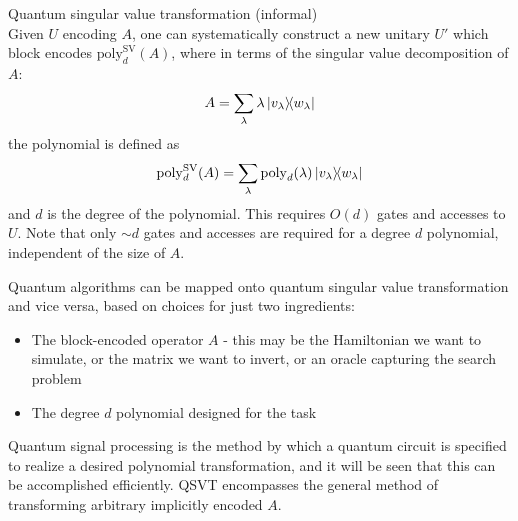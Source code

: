 \begin{claim}
    Quantum singular value transformation (informal) \\
    Given $U$ encoding $A$, one can systematically construct a new unitary $U'$ which block encodes $\text{poly}_d^{\text{SV}}(A)$, where in terms of the singular value decomposition of $A$:
    \begin{equation}
        A = \sum_\lambda \lambda \ketbra{v_\lambda}{w_\lambda}
    \end{equation}
    the polynomial is defined as 
    \begin{equation}\mathrm{poly}_d^{\text{SV}}(A) = \sum_\lambda \mathrm{poly}_d(\lambda)\ketbra{v_\lambda}{w_\lambda}\end{equation}
    and $d$ is the degree of the polynomial. This requires $O(d)$ gates and accesses to $U$. Note that only $\sim d$ gates and accesses are required for a degree $d$ polynomial, independent of the size of $A$.
\end{claim}

Quantum algorithms can be mapped onto quantum singular value transformation and vice versa, based on choices for just two ingredients:
\begin{itemize}
    \item The block-encoded operator $A$ - this may be the Hamiltonian we want to simulate, or the matrix we want to invert, or an oracle capturing the search problem
    \item The degree $d$ polynomial designed for the task
\end{itemize}
Quantum signal processing is the method by which a quantum circuit is specified to realize a desired polynomial transformation, and it will be seen that this can be accomplished efficiently. QSVT encompasses the general method of transforming arbitrary implicitly encoded $A$.

